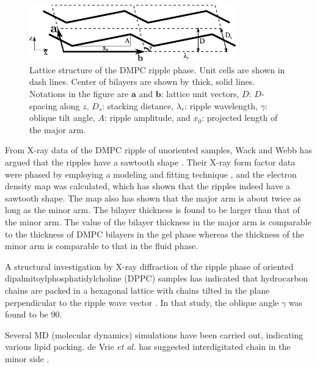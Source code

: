 \begin{figure}[htbp]
  \centering
  \includegraphics[width=0.8\textwidth]{figures/ripple/unit_cell}
  \caption{Lattice structure of the DMPC ripple phase. Unit cells are shown in
  dash lines. Center of bilayers are shown by thick, solid lines. Notations 
  in the figure are $\mathbf{a}$ and $\mathbf{b}$: lattice unit vectors,
  $D$: $D$-spacing along $z$, $D_s$: stacking distance, $\lambda_r$: 
  ripple wavelength, $\gamma$: oblique tilt angle, $A$: ripple amplitude,
  and $x_0$: projected length of the major arm.}
  \label{fig:lattice}
\end{figure}

From X-ray data of the DMPC ripple of unoriented samples, 
Wack and Webb has argued that the ripples have a sawtooth shape 
\cite{ref:Wack89}. Their X-ray form factor data were
phased by employing a modeling and fitting technique \cite{ref:Sun96},
and the electron density map was calculated, which has shown that  
the ripples indeed have a sawtooth shape. The map also has shown that
the major arm is about twice as long as the minor arm. The bilayer
thickness is found to be larger than that of the minor arm. The
value of the bilayer thickness in the major arm is comparable to the
thickness of DMPC bilayers in the gel phase whereas the thickness
of the minor arm is comparable to that in the fluid phase.

A structural investigation by X-ray diffraction of the ripple phase of
oriented dipalmitoylphosphatidylcholine (DPPC) samples has indicated that
hydrocarbon chains are packed in a hexagonal lattice with chains
tilted in the plane perpendicular to the ripple wave vector \cite{ref:Hentschel91}.
In that study, the oblique angle $\gamma$ was found to be 90\textdegree.

Several MD (molecular dynamics) simulations have been carried out, indicating
various lipid packing. de Vrie \textit{et al.} has suggested interdigitated chain in the
minor side \cite{ref:deVries05}.

